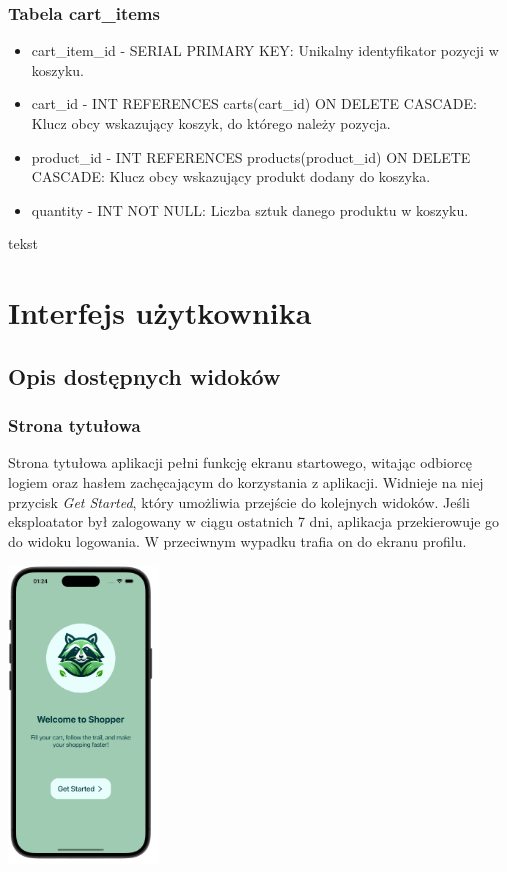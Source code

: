 \subsubsection{Tabela cart\_items}
\begin{itemize}
\item cart\_item\_id - SERIAL PRIMARY KEY: Unikalny identyfikator pozycji w koszyku.
\item cart\_id - INT REFERENCES carts(cart\_id) ON DELETE CASCADE: Klucz obcy wskazujący koszyk, do którego należy pozycja.
\item product\_id - INT REFERENCES products(product\_id) ON DELETE CASCADE: Klucz obcy wskazujący produkt dodany do koszyka.
\item quantity - INT NOT NULL: Liczba sztuk danego produktu w koszyku.
\end{itemize}

tekst

\section{Interfejs użytkownika}

\subsection{Opis dostępnych widoków}

\subsubsection{Strona tytułowa}

Strona tytułowa aplikacji pełni funkcję ekranu startowego, witając odbiorcę logiem oraz hasłem zachęcającym do korzystania z aplikacji. Widnieje na niej przycisk \textit{Get Started}, który umożliwia przejście do kolejnych widoków. Jeśli eksploatator był zalogowany w ciągu ostatnich 7 dni, aplikacja przekierowuje go do widoku logowania. W przeciwnym wypadku trafia on do ekranu profilu. 

\begin{center} \includegraphics[width=0.3\textwidth]{images/front/home_page.png} \end{center}


